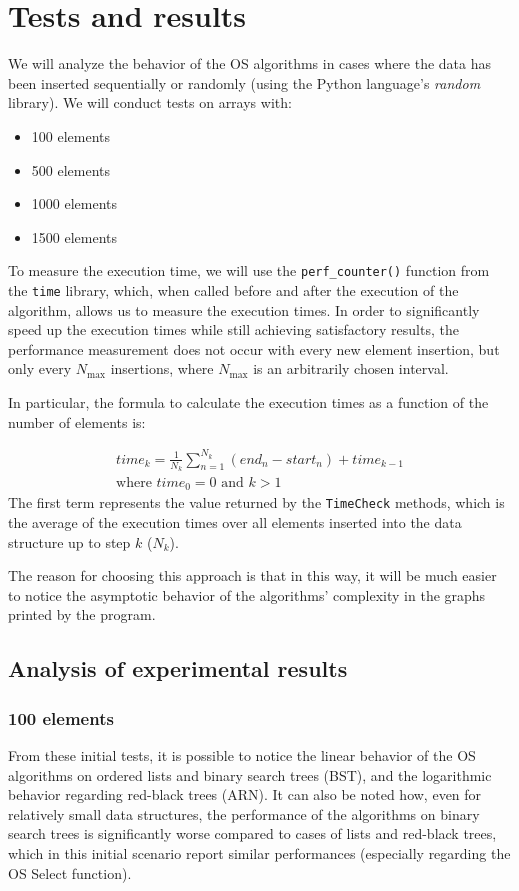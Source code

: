 \documentclass[11pt]{article}
\begin{document}
\section{Tests and results}
We will analyze the behavior of the OS algorithms in cases where the data has been inserted sequentially or randomly (using the Python language's \textit{random} library). We will conduct tests on arrays with:
\begin{itemize}
    \item 100 elements
    \item 500 elements
    \item 1000 elements
    \item 1500 elements
\end{itemize}

To measure the execution time, we will use the \texttt{perf\_counter()} function from the \texttt{time} library, which, when called before and after the execution of the algorithm, allows us to measure the execution times. In order to significantly speed up the execution times while still achieving satisfactory results, the performance measurement does not occur with every new element insertion, but only every $N_{\text{max}}$ insertions, where $N_{\text{max}}$ is an arbitrarily chosen interval.

In particular, the formula to calculate the execution times as a function of the number of elements is:

\begin{gather*}
\text{$time$}_k = \frac{1}{N_k} \sum_{n=1}^{N_k} (end_n - start_n) + \text{$time$}_{k-1} \\
\text{where } \text{$time$}_0 = 0 \text{ and } k > 1
\end{gather*}
The first term represents the value returned by the \texttt{TimeCheck} methods, which is the average of the execution times over all elements inserted into the data structure up to step $k$ ($N_k$).

The reason for choosing this approach is that in this way, it will be much easier to notice the asymptotic behavior of the algorithms' complexity in the graphs printed by the program.

\subsection{Analysis of experimental results}
\subsubsection{100 elements}
From these initial tests, it is possible to notice the linear behavior of the OS algorithms on ordered lists and binary search trees (BST), and the logarithmic behavior regarding red-black trees (ARN). It can also be noted how, even for relatively small data structures, the performance of the algorithms on binary search trees is significantly worse compared to cases of lists and red-black trees, which in this initial scenario report similar performances (especially regarding the OS Select function).
\end{document}
